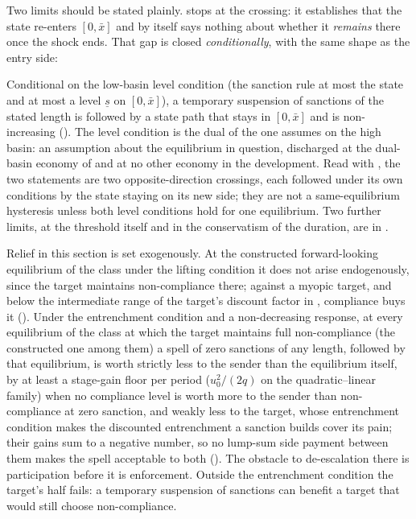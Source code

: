 Two limits should be stated plainly.  stops at the
crossing: it establishes that the state re-enters $[0,\bar x]$ and by itself
says nothing about whether it \emph{remains} there once the shock ends. That
gap is closed \emph{conditionally}, with the same shape as the entry side:

Conditional on the low-basin level condition (the sanction rule at most
the state and at most a level $\underline s$ on $[0,\bar x]$), a
temporary suspension of sanctions of the stated length is followed by a state path that
stays in $[0,\bar x]$ and is non-increasing (). The level condition is the dual of the one
 assumes on the high basin: an assumption about the
equilibrium in question, discharged at the dual-basin economy of
 and at no other economy in the
development. Read with , the two statements are two
opposite-direction crossings, each followed under its own conditions by the state staying on its new side; they
are not a same-equilibrium hysteresis unless both level conditions hold for
one equilibrium. Two further limits, at the threshold itself and in the
conservatism of the duration, are in .

Relief in this section is set exogenously. At the constructed forward-looking
equilibrium of the class under the lifting condition it does not arise endogenously, since the
target maintains non-compliance there; against a myopic target, and below the intermediate range of the target's discount factor in ,
compliance buys it (). Under the entrenchment condition and
a non-decreasing response, at every equilibrium of the class at which the
target maintains full non-compliance (the constructed one among them) a spell of
zero sanctions of any length, followed by that equilibrium, is worth
strictly less to the sender than the equilibrium itself, by at least a
stage-gain floor per period ($u_0^2/(2q)$ on the quadratic--linear family) when
no compliance level is worth more to the sender than non-compliance at zero sanction,
and weakly less to the target, whose entrenchment
condition makes the discounted entrenchment a sanction builds cover its pain;
their gains sum to a negative number, so no lump-sum side payment between them
makes the spell acceptable to both (). The
obstacle to de-escalation there is participation before it is enforcement.
Outside the entrenchment condition the target's half fails: a temporary suspension
of sanctions can benefit a target that would still choose non-compliance.

